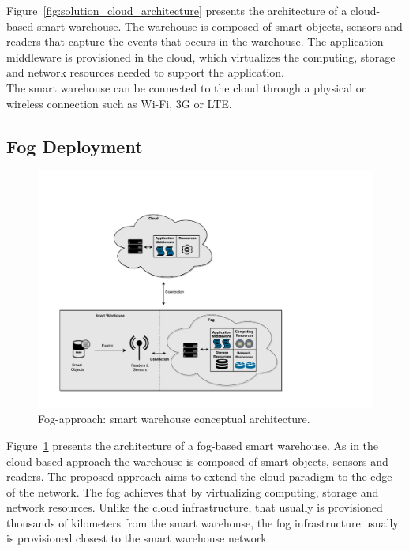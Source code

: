 Figure~\ref{fig:solution_cloud_architecture} presents the architecture of a cloud-based smart warehouse.
The warehouse is composed of smart objects, sensors and readers that capture the events that occurs
in the warehouse. The application middleware is provisioned in the cloud, which virtualizes the computing,
storage and network resources needed to support the application.\\

The smart warehouse can be connected to the cloud through a physical or wireless connection such as
Wi-Fi, 3G or \gls{LTE}.

\subsection{Fog Deployment}
\label{sub:sol_fog}

\begin{figure}[ht!]
  \centering
  \includegraphics[width=\textwidth]{./images/solution_fog_architecture}
  \caption[Fog-approach: conceptual architecture.]{Fog-approach: smart warehouse conceptual architecture.}
  \label{fig:solution_fog_architecture}
\end{figure}

Figure~\ref{fig:solution_fog_architecture} presents the architecture of a fog-based smart warehouse.
As in the cloud-based approach the warehouse is composed of smart objects, sensors and readers.
The proposed approach aims to extend the cloud paradigm to the edge of the network. The fog achieves
that by virtualizing computing, storage and network resources. Unlike the cloud infrastructure, that
usually is provisioned thousands of kilometers from the smart warehouse, the fog infrastructure
usually is provisioned closest to the smart warehouse network.\\


